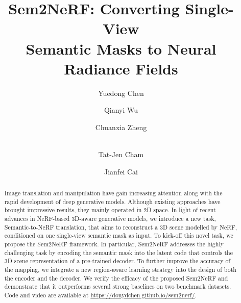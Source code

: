 \documentclass[runningheads]{llncs}
\begin{document}
\pagestyle{headings}
\mainmatter
\def\ECCVSubNumber{636}  

\title{Sem2NeRF: Converting Single-View \\ Semantic Masks to Neural Radiance Fields} 

\begin{comment}
\titlerunning{ECCV-22 submission ID \ECCVSubNumber} 
\authorrunning{ECCV-22 submission ID \ECCVSubNumber} 
\author{Anonymous ECCV submission}
\institute{Paper ID \ECCVSubNumber}
\end{comment}


\author{Yuedong Chen\textsuperscript{\Letter} \and
Qianyi Wu \and
Chuanxia Zheng \and \\
Tat-Jen Cham \and
Jianfei Cai
}
\maketitle

\begin{abstract}

Image translation and manipulation have gain increasing attention along with the rapid development of deep generative models. Although existing approaches have brought impressive results, they mainly operated in 2D space. 
In light of recent advances in NeRF-based 3D-aware generative models,
we introduce a new task, Semantic-to-NeRF translation, that aims to reconstruct a 3D scene modelled by NeRF, conditioned on one single-view semantic mask as input. To kick-off this novel task, we propose the Sem2NeRF framework.
In particular, Sem2NeRF addresses the highly challenging task by encoding the semantic mask into the latent code that controls the 3D scene representation of a pre-trained decoder. To further improve the accuracy of the mapping, we integrate a new region-aware learning strategy into the design of both the encoder and the decoder. We verify the efficacy of the proposed Sem2NeRF and demonstrate that it outperforms several strong baselines on two benchmark datasets. Code and video are available at \url{https://donydchen.github.io/sem2nerf/}.

\end{abstract}
\end{document}
